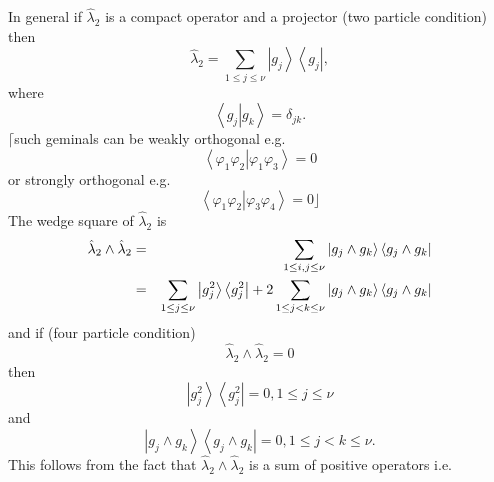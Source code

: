 \documentclass[12pt]{article}
\begin{document}
In general if $\hat{\lambda}_{2}$ is a compact operator and a projector (two
particle condition) then 
\begin{equation}
\hat{\lambda}_{2}=\sum_{1\leq j\leq \nu }\left\vert g_{j}\right\rangle
\left\langle g_{j}\right\vert ,
\end{equation}%
where 
\begin{equation}
\left\langle \left. g_{j}\right\vert g_{k}\right\rangle =\delta _{jk}.
\end{equation}%
$\lceil $such geminals can be weakly orthogonal e.g. 
\begin{equation}
\left\langle \varphi _{1}\varphi _{2}\left\vert \varphi _{1}\varphi
_{3}\right. \right\rangle =0
\end{equation}%
or strongly orthogonal e.g. 
\begin{equation}
\left\langle \varphi _{1}\varphi _{2}\left\vert \varphi _{3}\varphi
_{4}\right. \right\rangle =0\rfloor
\end{equation}%
The wedge square of $\hat{\lambda}_{2}$ is 
\begin{eqnarray}
\hat{\lambda}_{2}\wedge \hat{\lambda}_{2} &=&\sum_{1\leq i,j\leq \nu
}\left\vert g_{j}\wedge g_{k}\right\rangle \left\langle g_{j}\wedge
g_{k}\right\vert  \notag \\
&=&\sum_{1\leq j\leq \nu }\left\vert g_{j}^{2}\right\rangle \left\langle
g_{j}^{2}\right\vert +2\sum_{1\leq j<k\leq \nu }\left\vert g_{j}\wedge
g_{k}\right\rangle \left\langle g_{j}\wedge g_{k}\right\vert
\end{eqnarray}%
and if (four particle condition) 
\begin{equation}
\hat{\lambda}_{2}\wedge \hat{\lambda}_{2}=0
\end{equation}%
then 
\begin{equation}
\left\vert g_{j}^{2}\right\rangle \left\langle g_{j}^{2}\right\vert =0,1\leq
j\leq \nu
\end{equation}%
and%
\begin{equation}
\left\vert g_{j}\wedge g_{k}\right\rangle \left\langle g_{j}\wedge
g_{k}\right\vert =0,1\leq j<k\leq \nu .
\end{equation}%
This follows from the fact that $\hat{\lambda}_{2}\wedge \hat{\lambda}_{2}$
is a sum of positive operators i.e.
\end{document}
